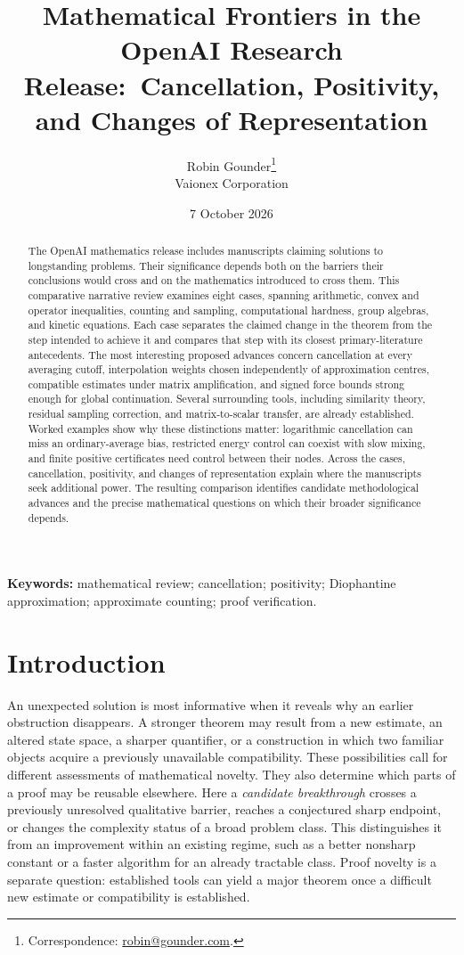 \documentclass[11pt]{article}
\title{Mathematical Frontiers in the OpenAI Research Release:\
Cancellation, Positivity, and Changes of Representation}
\author{Robin Gounder\thanks{Correspondence: \href{mailto:robin@gounder.com}{robin@gounder.com}.}\\
{\small Vaionex Corporation}}
\date{7 October 2026}
\begin{document}
\maketitle
\begin{abstract}
The OpenAI mathematics release includes manuscripts claiming solutions to
longstanding problems. Their significance depends both on the barriers
their conclusions would cross and on the mathematics introduced to cross
them. This comparative
narrative review examines eight cases, spanning arithmetic, convex and
operator inequalities, counting and sampling, computational hardness,
group algebras, and kinetic equations. Each case separates the claimed
change in the theorem from the step intended to achieve it and compares
that step with its closest primary-literature antecedents. The most
interesting proposed advances concern cancellation at every averaging
cutoff, interpolation weights chosen independently of approximation
centres, compatible estimates under matrix amplification, and signed
force bounds strong enough for global continuation. Several surrounding
tools, including similarity theory, residual sampling correction, and
matrix-to-scalar transfer, are already established. Worked examples show
why these distinctions matter: logarithmic cancellation can miss an
ordinary-average bias, restricted energy control can coexist with slow
mixing, and finite positive certificates need control between their
nodes. Across the cases, cancellation, positivity, and changes of
representation explain where the manuscripts seek additional power.
The resulting comparison identifies candidate methodological advances
and the precise mathematical questions on which their broader
significance depends.
\end{abstract}
\noindent\textbf{Keywords:} mathematical review; cancellation; positivity;
Diophantine approximation; approximate counting; proof verification.

\section{Introduction}
An unexpected solution is most informative when it reveals why an earlier
obstruction disappears. A stronger theorem may result from a new estimate,
an altered state space, a sharper quantifier, or a construction in which
two familiar objects acquire a previously unavailable compatibility.
These possibilities call for different assessments of mathematical novelty.
They also determine which parts of a proof may be reusable elsewhere.
Here a \emph{candidate breakthrough} crosses a previously unresolved
qualitative barrier, reaches a conjectured sharp endpoint, or changes
the complexity status of a broad problem class. This distinguishes it
from an improvement within an existing regime, such as a better
nonsharp constant or a faster algorithm for an already tractable class.
Proof novelty is a separate question: established tools can yield a major
theorem once a difficult new estimate or compatibility is established.
\end{document}
